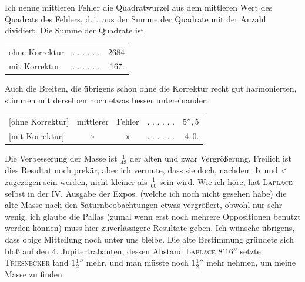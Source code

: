 \par Ich nenne mittleren Fehler die Quadratwurzel aus dem mittleren Wert des Quadrats des Fehlers, d.\,i.\ aus der Summe der Quadrate mit der Anzahl dividiert. Die Summe der Quadrate ist
\begin{center}
\begin{tabular}{@{}lcr@{}}
ohne Korrektur&. . . . . .&2684\\
mit Korrektur&. . . . . .&167.
\end{tabular}
\end{center}
\par Auch die Breiten, die übrigens schon ohne die Korrektur recht gut harmonierten, stimmen mit derselben noch etwas besser untereinander:
\begin{center}
\begin{tabular}{@{}lcccr@{}}
[ohne Korrektur]&mittlerer&Fehler&. . . . . .&\(5''{,}5\)\\
{}[mit Korrektur]&»&»&. . . . . .&\(4{,}0\).
\end{tabular}
\end{center}
\par Die Verbesserung der Masse ist \(\frac{1}{43}\) der alten und zwar Vergrößerung. Freilich ist dies Resultat noch prekär, aber ich vermute, dass sie doch, nachdem {\AstroSymbols ♄} und {\AstroSymbols ♂} zugezogen sein werden, nicht kleiner als \(\frac{1}{60}\) sein wird. Wie ich höre, hat \textsc{Laplace} selbst in der IV. Ausgabe der Expos. (welche ich noch nicht gesehen habe) die alte Masse nach den Saturnbeobachtungen etwas vergrößert, obwohl nur sehr wenig, ich glaube die Pallas (zumal wenn erst noch mehrere Oppositionen benutzt werden können) muss hier zuverlässigere Resultate geben. Ich wünsche übrigens, dass obige Mitteilung noch unter uns bleibe. Die alte Bestimmung gründete sich bloß auf den 4. Jupitertrabanten, dessen Abstand \textsc{Laplace} \(8'16''\) setzte; \textsc{Triesnecker} fand \(1\frac{1}{2}''\) mehr, und man müsste noch \(1\frac{1}{2}''\) mehr nehmen, um meine Masse zu finden.
\par
